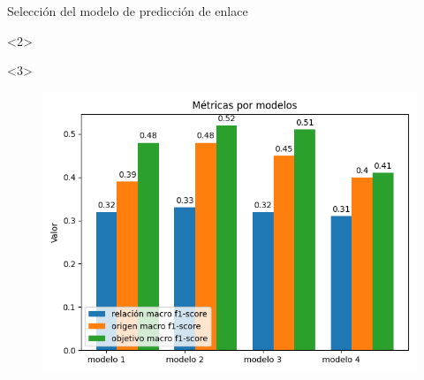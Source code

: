 \documentclass{beamer}
\begin{document}
\begin{frame}{Selección del modelo de predicción de enlace}
    \begin{onlyenv}<2>
        \begin{table}
            \begin{center}
            \caption{Variantes de arquitectura de los modelos de predicción de enlaces.}
            \end{center}
        \end{table}
    \end{onlyenv}
    \begin{onlyenv}<3>
        \begin{figure}
            \includegraphics[scale=0.6]{Graphics/persuasive_essays_all_linked_all_relation_f1_scores.png}

\end{figure}
\end{onlyenv}
\end{frame}
\end{document}
